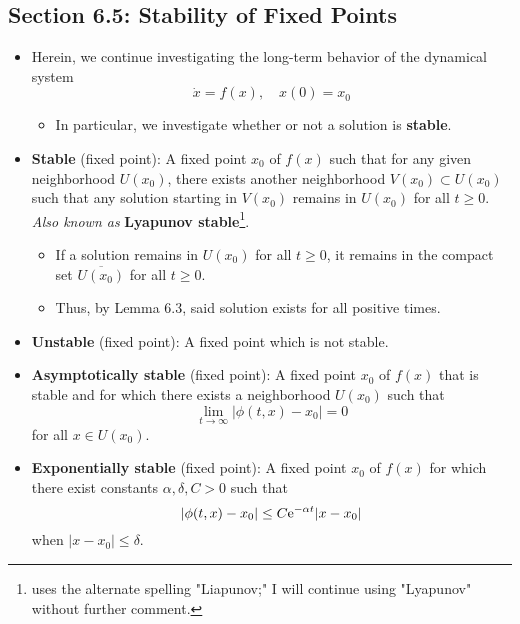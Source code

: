 \documentclass[../notes.tex]{subfiles}
\begin{document}
\subsection*{Section 6.5: Stability of Fixed Points}
\begin{itemize}
    \item Herein, we continue investigating the long-term behavior of the dynamical system
    \begin{equation*}
        \dot{x} = f(x)
        ,\quad
        x(0) = x_0
    \end{equation*}
    \begin{itemize}
        \item In particular, we investigate whether or not a solution is \textbf{stable}.
    \end{itemize}
    \item \textbf{Stable} (fixed point): A fixed point $x_0$ of $f(x)$ such that for any given neighborhood $U(x_0)$, there exists another neighborhood $V(x_0)\subset U(x_0)$ such that any solution starting in $V(x_0)$ remains in $U(x_0)$ for all $t\geq 0$. \emph{Also known as} \textbf{Lyapunov stable}\footnote{\textcite{bib:Teschl} uses the alternate spelling "Liapunov;" I will continue using "Lyapunov" without further comment.}.
    \begin{itemize}
        \item If a solution remains in $U(x_0)$ for all $t\geq 0$, it remains in the compact set $\overline{U(x_0)}$ for all $t\geq 0$.
        \item Thus, by Lemma 6.3, said solution exists for all positive times.
    \end{itemize}
    \item \textbf{Unstable} (fixed point): A fixed point which is not stable.
    \item \textbf{Asymptotically stable} (fixed point): A fixed point $x_0$ of $f(x)$ that is stable and for which there exists a neighborhood $U(x_0)$ such that
    \begin{equation*}
        \lim_{t\to\infty}|\phi(t,x)-x_0| = 0
    \end{equation*}
    for all $x\in U(x_0)$.
    \item \textbf{Exponentially stable} (fixed point): A fixed point $x_0$ of $f(x)$ for which there exist constants $\alpha,\delta,C>0$ such that
    \begin{equation*}
        |\phi(t,x)-x_0| \leq C\e[-\alpha t]|x-x_0|
    \end{equation*}
    when $|x-x_0|\leq\delta$.

\end{itemize}
\end{document}
